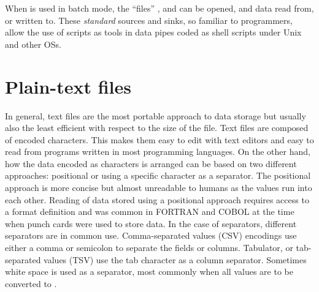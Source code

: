 \documentclass[krantz2]{krantz}\usepackage{knitr}
\begin{document}
When \Rpgrm is used in batch mode, the ``files'' ,  and  can be opened, and data read from, or written to. These \emph{standard} sources and sinks, so familiar to \Clang programmers, allow the use of \Rlang scripts as tools in data pipes coded as shell scripts under Unix and other OSs.

\section{Plain-text files}\label{sec:files:txt}
In general, text files are the most portable approach to data storage but usually also the least efficient with respect to the size of the file. Text files are composed of encoded characters. This makes them easy to edit with text editors and easy to read from programs written in most programming languages. On the other hand, how the data encoded as characters is arranged can be based on two different approaches: positional or using a specific character as a separator. The positional approach is more concise but almost unreadable to humans as the values run into each other. Reading of data stored using a positional approach requires access to a format definition and was common in FORTRAN and COBOL at the time when punch cards were used to store data. In the case of separators, different separators are in common use. Comma-separated values (CSV) encodings use either a comma or semicolon to separate the fields or columns. Tabulator, or tab-separated values (TSV) use the tab character as a column separator. Sometimes white space is used as a separator, most commonly when all values are to be converted to .
\end{document}
